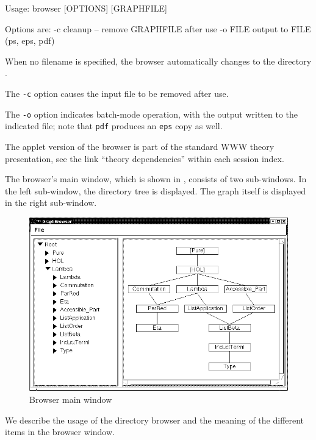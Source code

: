 \begin{isabellebody}
\begin{isamarkuptext}
\begin{ttbox}
Usage: browser [OPTIONS] [GRAPHFILE]

  Options are:
    -c           cleanup -- remove GRAPHFILE after use
    -o FILE      output to FILE (ps, eps, pdf)
\end{ttbox}
  When no filename is specified, the browser automatically changes to
  the directory \hyperlink{setting.ISABELLE-BROWSER-INFO}{\mbox{}}.

  \medskip The \verb|-c| option causes the input file to be
  removed after use.

  The \verb|-o| option indicates batch-mode operation, with the
  output written to the indicated file; note that \verb|pdf|
  produces an \verb|eps| copy as well.

  \medskip The applet version of the browser is part of the standard
  WWW theory presentation, see the link ``theory dependencies'' within
  each session index.%
\end{isamarkuptext}%
\isamarkuptrue%
%
\isamarkuptrue%
%
\begin{isamarkuptext}%
The browser's main window, which is shown in
  , consists of two sub-windows.  In the
  left sub-window, the directory tree is displayed. The graph itself
  is displayed in the right sub-window.

  \begin{figure}[ht]
  \includegraphics[width=\textwidth]{browser_screenshot}
  \caption{\label{fig:browserwindow} Browser main window}
  \end{figure}%
\end{isamarkuptext}%
\isamarkuptrue%
%
\isamarkuptrue%
%
\begin{isamarkuptext}%
We describe the usage of the directory browser and the meaning of
  the different items in the browser window.


\end{isamarkuptext}
\end{isabellebody}
